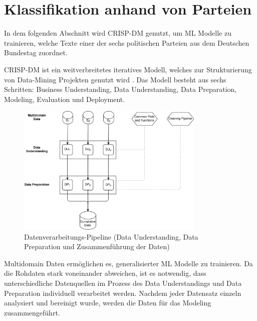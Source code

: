 
\chapter{Klassifikation anhand von Parteien} \label{ch:crispDm_1}

In dem folgenden Abschnitt wird \ac{CRISP-DM} genutzt, um \ac{ML} Modelle zu trainieren, welche Texte einer der sechs politischen Parteien aus dem Deutschen Bundestag zuordnet. 


\ac{CRISP-DM} ist ein weitverbreitetes iteratives Modell, welches zur Strukturierung von Data-Mining Projekten genutzt wird \autocite{martinez-plumed_casp-dm_2017, chapman_crisp-dm_2000}. Das Modell besteht aus sechs Schritten: Business Understanding, Data Understanding, Data Preparation, Modeling, Evaluation und Deployment. 

\begin{figure}[H]
    \centering
    \includegraphics[width=0.8\textwidth]{data/images/data_flow_v2_1.png}
    \caption[Datenverarbeitungs-Pipeline]{Datenverarbeitungs-Pipeline (Data Understanding, Data Preparation und Zusammenführung der Daten)} \label{fig:dataFlow_1}
\end{figure}


Multidomain Daten ermöglichen es, generalisierter \ac{ML} Modelle zu trainieren. Da die Rohdaten stark voneinander abweichen, ist es notwendig, dass unterschiedliche Datenquellen im Prozess des Data Understandings und Data Preparation individuell verarbeitet werden. Nachdem jeder Datensatz einzeln analysiert und bereinigt wurde, werden die Daten für das Modeling zusammengeführt.

